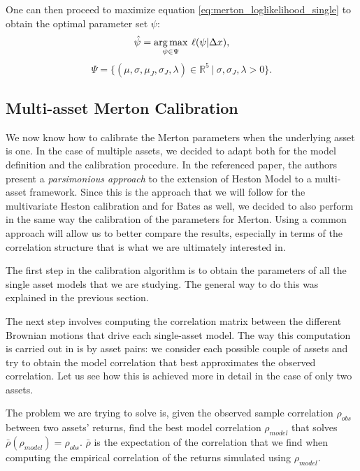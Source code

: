One can then proceed to maximize equation \eqref{eq:merton_loglikelihood_single} to obtain the optimal parameter set $\psi$:
\begin{equation}
\hat{\psi} = \operatorname*{arg\,max}_{\psi \in \Psi} \:\ell(\psi |  \Delta x),
\end{equation}
\begin{equation}
\Psi = \{ (\mu, \sigma, \mu_J, \sigma_J, \lambda) \in \mathbb{R}^5 \: |\: \sigma,\sigma_J, \lambda >0\}.
\end{equation}

\subsection{Multi-asset Merton Calibration}
\label{subsec:multi_merton_cal}

We now know  how to calibrate the Merton parameters when the underlying asset is one.
In the case of multiple assets, we decided to adapt \citep{PARSIMONIOUS2011} both for the model definition and the calibration procedure.
In the referenced paper, the authors present a \textit{parsimonious approach} to the extension of Heston Model to a multi-asset framework. Since this is the approach that we will follow for the multivariate Heston calibration and for Bates as well, we decided to also perform in the same way the calibration of the parameters for Merton.
Using a common approach will allow us to better compare the results, especially in terms of the correlation structure that is what we are ultimately interested in.

The first step in the calibration algorithm is to obtain the parameters of all the single asset models that we are studying. The general way to do this was explained in the previous section. 

The next step involves computing the correlation matrix between the different Brownian motions that drive each single-asset model. 
The way this computation is carried out in \citep{PARSIMONIOUS2011} is by asset pairs: we consider each possible couple of assets and try to obtain the model correlation that best approximates the observed correlation.
Let us see how this is achieved more in detail in the case of only two assets.

The problem we are trying to solve is, given the observed sample correlation $\rho_{obs}$ between two assets' returns, find the best model correlation $\rho_{model}$ that solves $\bar{\rho}(\rho_{model}) = \rho_{obs}$.
$\bar{\rho}$ is the expectation of the correlation that we find when computing the  empirical correlation of the returns simulated using $\rho_{model}$.

